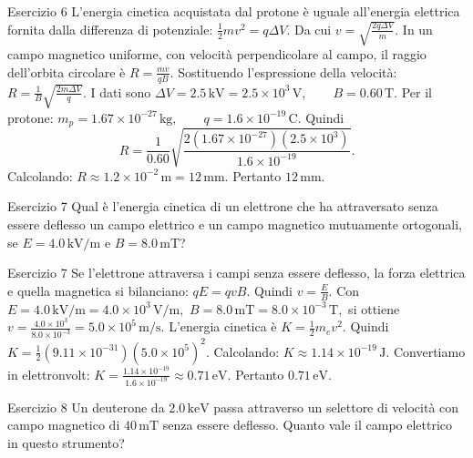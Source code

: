 \documentclass[a4paper]{article}
\begin{document}
\begin{snippetsolution}{Esercizio 6}
    L'energia cinetica acquistata dal protone è uguale all'energia elettrica
    fornita dalla differenza di potenziale:
    \(\frac{1}{2}mv^2 = q\Delta V.\)
    Da cui
    \(v = \sqrt{\frac{2q\Delta V}{m}}.\)
    In un campo magnetico uniforme, con velocità perpendicolare al campo, il
    raggio dell'orbita circolare è
    \(R = \frac{mv}{qB}.\)
    Sostituendo l'espressione della velocità:
    \(R = \frac{1}{B} \sqrt{\frac{2m\Delta V}{q}}.\)
    I dati sono
    \(\Delta V = 2.5\,\mathrm{kV} = 2.5 \times 10^3\,\mathrm{V}, \qquad B = 0.60\,\mathrm{T}.\)
    Per il protone:
    \(m_p = 1.67 \times 10^{-27}\,\mathrm{kg}, \qquad q = 1.6 \times 10^{-19}\,\mathrm{C}.\)
    Quindi
    \[
        R =
        \frac{1}{0.60}
        \sqrt{
            \frac{
                2
                \left(1.67 \times 10^{-27}\right)
                \left(2.5 \times 10^3\right)
            }{
                1.6 \times 10^{-19}
            }
        }.
    \]
    Calcolando:
    \(R \approx 1.2 \times 10^{-2}\,\mathrm{m} = 12\,\mathrm{mm}.\)
    Pertanto
    \(\boxed{12\,\mathrm{mm}}.\)
\end{snippetsolution}
\begin{snippetexercise}{Esercizio 7}
    Qual è l'energia cinetica di un elettrone che ha attraversato senza essere
    deflesso un campo elettrico e un campo magnetico mutuamente ortogonali, se
    \(E = 4.0\,\mathrm{kV/m}\) e \(B = 8.0\,\mathrm{mT}\)?

\end{snippetexercise}
\begin{snippetsolution}{Esercizio 7}
    Se l'elettrone attraversa i campi senza essere deflesso, la forza elettrica
    e quella magnetica si bilanciano:
    \(qE = qvB.\)
    Quindi
    \(v = \frac{E}{B}.\)
    Con
    \(E = 4.0\,\mathrm{kV/m} = 4.0 \times 10^3\,\mathrm{V/m},\)
    \(B = 8.0\,\mathrm{mT} = 8.0 \times 10^{-3}\,\mathrm{T},\)
    si ottiene
    \(v = \frac{4.0 \times 10^3}{8.0 \times 10^{-3}} = 5.0 \times 10^5\,\mathrm{m/s}.\)
    L'energia cinetica è
    \(K = \frac{1}{2}m_ev^2.\)
    Quindi
    \(K = \frac{1}{2} \left(9.11 \times 10^{-31}\right) \left(5.0 \times 10^5\right)^2.\)
    Calcolando:
    \(K \approx 1.14 \times 10^{-19}\,\mathrm{J}.\)
    Convertiamo in elettronvolt:
    \(K = \frac{1.14 \times 10^{-19}}{1.6 \times 10^{-19}} \approx 0.71\,\mathrm{eV}.\)
    Pertanto
    \(\boxed{0.71\,\mathrm{eV}}.\)
\end{snippetsolution}
\begin{snippetexercise}{Esercizio 8}
    Un deuterone da \(2.0\,\mathrm{keV}\) passa attraverso un selettore di
    velocità con campo magnetico di \(40\,\mathrm{mT}\) senza essere deflesso.
    Quanto vale il campo elettrico in questo strumento?

\end{snippetexercise}
\end{document}
